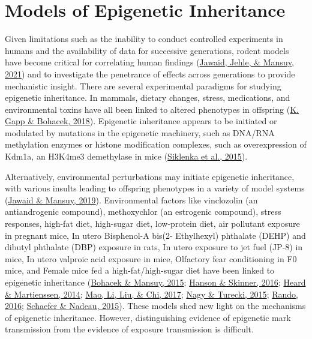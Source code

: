 \documentclass[12pt,twoside]{reedthesis}
\begin{document}
\hypertarget{models-of-epigenetic-inheritance}{%
\section*{Models of Epigenetic Inheritance}\label{models-of-epigenetic-inheritance}}

Given limitations such as the inability to conduct controlled
experiments in humans and the availability of data for successive
generations, rodent models have become critical for correlating human
findings (\protect\hyperlink{ref-jawaid2021}{Jawaid, Jehle, \& Mansuy, 2021}) and to investigate the penetrance of effects
across generations to provide mechanistic insight. There are several
experimental paradigms for studying epigenetic inheritance. In mammals,
dietary changes, stress, medications, and environmental toxins have all
been linked to altered phenotypes in offspring (\protect\hyperlink{ref-gapp2018}{K. Gapp \& Bohacek, 2018}). Epigenetic
inheritance appears to be initiated or modulated by mutations in the
epigenetic machinery, such as DNA/RNA methylation enzymes or histone
modification complexes, such as overexpression of Kdm1a, an H3K4me3
demethylase in mice (\protect\hyperlink{ref-siklenka2015}{Siklenka et al., 2015}).

Alternatively, environmental perturbations may initiate epigenetic
inheritance, with various insults leading to offspring phenotypes in a
variety of model systems (\protect\hyperlink{ref-jawaid2019}{Jawaid \& Mansuy, 2019}). Environmental factors like
vinclozolin (an antiandrogenic compound), methoxychlor (an estrogenic
compound), stress responses, high-fat diet, high-sugar diet, low-protein
diet, air pollutant exposure in pregnant mice, In utero Bisphenol-A
bis(2- Ethylhexyl) phthalate (DEHP) and dibutyl phthalate (DBP) exposure
in rats, In utero exposure to jet fuel (JP-8) in mice, In utero valproic
acid exposure in mice, Olfactory fear conditioning in F0 mice, and
Female mice fed a high-fat/high-sugar diet have been linked to
epigenetic inheritance (\protect\hyperlink{ref-bohacek2015}{Bohacek \& Mansuy, 2015}; \protect\hyperlink{ref-hanson2016}{Hanson \& Skinner, 2016}; \protect\hyperlink{ref-heard2014}{Heard \& Martienssen, 2014}; \protect\hyperlink{ref-mao2017}{Mao, Li, Liu, \& Chi, 2017}; \protect\hyperlink{ref-nagy2015}{Nagy \& Turecki, 2015}; \protect\hyperlink{ref-rando2016}{Rando, 2016}; \protect\hyperlink{ref-schaefer2015}{Schaefer \& Nadeau, 2015}). These models shed new light on
the mechanisms of epigenetic inheritance. However, distinguishing
evidence of epigenetic mark transmission from the evidence of exposure
transmission is difficult.
\end{document}
